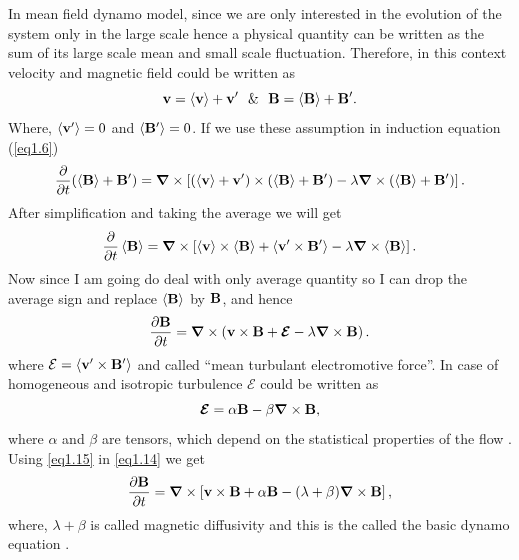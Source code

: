 In mean field dynamo model, since we are only interested in the evolution of the system only in the large scale hence a physical quantity can be written as the sum of its large scale mean and small scale fluctuation. Therefore, in this context velocity and magnetic field could be written as
\begin{equation}
    \vb{v}=\vb{\langle v\rangle}+\vb{v^\prime}~~\&~~\vb{B}=\vb{\langle B\rangle}+\vb{B^\prime}.
    \label{eq1.11}
\end{equation}
Where, $\left\langle \vb{v}^\prime \right\rangle=0$ and $\left\langle \vb{B}^\prime \right\rangle=0$. If we use these assumption in induction equation (\autoref{eq1.6})
\begin{equation}
    \frac{\partial}{\partial t}(\left\langle \vb{B} \right\rangle+\vb{B^\prime})=\bm{\nabla}\times\left[ (\left\langle \vb{v} \right\rangle+ \vb{v^\prime})\times (\left\langle \vb{B} \right\rangle+ \vb{B^\prime)} -\lambda\bm{\nabla}\times(\left\langle \vb{B} \right\rangle+\vb{B^\prime})\right].
    \label{eq1.12}
\end{equation}
After simplification and taking the average we will get
\begin{equation}
    \frac{\partial}{\partial t}\left\langle \vb{B} \right\rangle=\bm{\nabla}\times\left[\left\langle \vb{v} \right\rangle\times \left\langle \vb{B} \right\rangle+\left\langle \vb{v}^\prime\times\vb{B}^\prime \right\rangle -\lambda\bm{\nabla}\times\left\langle \vb{B} \right\rangle\right].
    \label{eq1.13}
\end{equation}
Now since I am going do deal with only average quantity so I can drop the average sign and replace $\left\langle \vb{B} \right\rangle$ by $\vb{B}$, and hence
\begin{equation}
    \frac{\partial \vb{B}}{\partial t}=\bm{\nabla}\times\left(\vb{v}\times \vb{B}+ \bm{\mathcal{E}} -\lambda\bm{\nabla}\times\vb{B}\right).
    \label{eq1.14}
\end{equation}
 where 
$\mathcal{E}=\left\langle \vb{v}^\prime\times\vb{B}^\prime \right\rangle$ and called ``mean turbulant electromotive force''. In case of homogeneous and isotropic turbulence $\mathcal{E}$ could be written as \citep{Choudhuri1998book, Charbonneau2010}
\begin{equation}
    \bm{\mathcal{E}}=\alpha \vb{B}-\beta\bm{\nabla}\times \vb{B},
    \label{eq1.15}
\end{equation}
where $\alpha$ and $\beta$ are tensors, which depend on the statistical properties of the flow \citep{Krause1980}. Using \autoref{eq1.15} in \autoref{eq1.14} we get
\begin{equation}
    \frac{\partial \vb{B}}{\partial t}=\bm{\nabla}\times\left[\vb{v}\times \vb{B}+ \alpha \vb{B} -(\lambda+\beta)\bm{\nabla}\times\vb{B}\right],
    \label{eq1.16}
\end{equation}
where, $\lambda+\beta$ is called magnetic diffusivity \citep{Charbonneau2010} and this is the called the basic dynamo equation \citep{Choudhuri1998book}.


